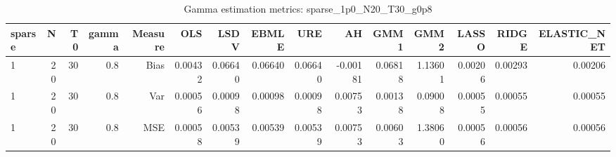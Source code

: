 \begin{table}[!htbp]\centering
\caption{Gamma estimation metrics: sparse_1p0_N20_T30_g0p8}
\label{tab:table1_sparse_1p0_N20_T30_g0p8}
\begin{tabular}{lrrrrrrrrrrrrrr}
\hline
sparse & N & T0 & gamma & Measure & OLS & LSDV & EBMLE & URE & AH & GMM1 & GMM2 & LASSO & RIDGE & ELASTIC_NET \\
\hline
1 & 20 & 30 & 0.8 & Bias & 0.00432 & 0.06640 & 0.06640 & 0.06640 & -0.00181 & 0.06818 & 1.13601 & 0.00206 & 0.00293 & 0.00206 \\
1 & 20 & 30 & 0.8 & Var & 0.00056 & 0.00098 & 0.00098 & 0.00098 & 0.00753 & 0.00138 & 0.09008 & 0.00055 & 0.00055 & 0.00055 \\
1 & 20 & 30 & 0.8 & MSE & 0.00058 & 0.00539 & 0.00539 & 0.00539 & 0.00753 & 0.00603 & 1.38060 & 0.00056 & 0.00056 & 0.00056 \\
\hline
\end{tabular}
\end{table}


